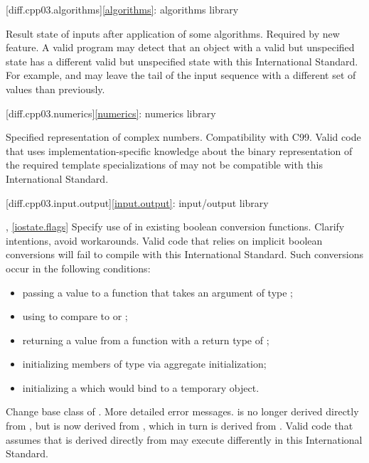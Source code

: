 [diff.cpp03.algorithms]{\ref{algorithms}: algorithms library}

\change Result state of inputs after application of some algorithms.
\rationale Required by new feature.
\effect
A valid \CppIII{} program may detect that an object with a valid but
unspecified state has a different valid but unspecified state with this
International Standard. For example,  and
 may leave the tail of the input sequence with a
different set of values than previously.

[diff.cpp03.numerics]{\ref{numerics}: numerics library}

\change Specified representation of complex numbers.
\rationale Compatibility with C99.
\effect
Valid \CppIII{} code that uses implementation-specific knowledge about the
binary representation of the required template specializations of
 may not be compatible with this International Standard.

[diff.cpp03.input.output]{\ref{input.output}: input/output library}

, \ref{iostate.flags}
\change Specify use of  in existing boolean conversion functions.
\rationale Clarify intentions, avoid workarounds.
\effect
Valid \CppIII{} code that relies on implicit boolean conversions will fail to
compile with this International Standard. Such conversions occur in the
following conditions:

\begin{itemize}
\item passing a value to a function that takes an argument of type ;
\item using  to compare to  or ;
\item returning a value from a function with a return type of ;
\item initializing members of type  via aggregate initialization;
\item initializing a  which would bind to a temporary object.
\end{itemize}

\change Change base class of .
\rationale More detailed error messages.
\effect
{} is no longer derived directly from
, but is now derived from ,
which in turn is derived from . Valid \CppIII{} code
that assumes that  is derived directly from
 may execute differently in this International Standard.

